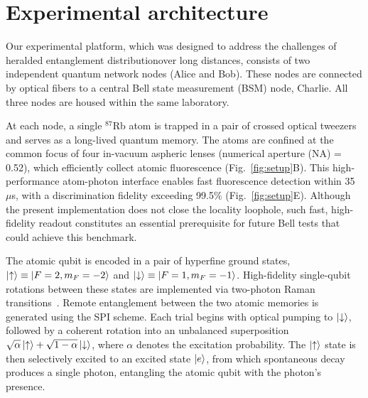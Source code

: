\documentclass[aps,reprint,showpacs,superscriptaddress]{revtex4-2}
\begin{document}
\section*{Experimental architecture}
Our experimental platform, which was designed to address the challenges of heralded entanglement distributionover long distances, consists of two independent quantum network nodes (Alice and Bob). These nodes are connected by optical fibers to a central Bell state measurement (BSM) node, Charlie. All three nodes are housed within the same laboratory.

At each node, a single $^{87}$Rb atom is trapped in a pair of crossed optical tweezers and serves as a long-lived quantum memory. The atoms are confined at the common focus of four in-vacuum aspheric lenses (numerical aperture (NA) = 0.52), which efficiently collect atomic fluorescence (Fig.~\ref{fig:setup}B). This high-performance atom-photon interface enables fast fluorescence detection within 35~$\mu$s, with a discrimination fidelity exceeding 99.5\% (Fig.~\ref{fig:setup}E). Although the present implementation does not close the locality loophole, such fast, high-fidelity readout constitutes an essential prerequisite for future Bell tests that could achieve this benchmark.

The atomic qubit is encoded in a pair of hyperfine ground states, $\ket{\uparrow} \equiv \ket{F = 2, m_F = -2}$ and $\ket{\downarrow} \equiv \ket{F = 1, m_F = -1}$. High-fidelity single-qubit rotations between these states are implemented via two-photon Raman transitions~\cite{levine2022dispersive}. Remote entanglement between the two atomic memories is generated using the SPI scheme. Each trial begins with optical pumping to $\ket{\downarrow}$, followed by a coherent rotation into an unbalanced superposition $\sqrt{\alpha}\ket{\uparrow}+\sqrt{1-\alpha}\ket{\downarrow}$, where $\alpha$ denotes the excitation probability. The $\ket{\uparrow}$ state is then selectively excited to an excited state $\ket{e}$, from which spontaneous decay produces a single photon, entangling the atomic qubit with the photon's presence.
\end{document}
